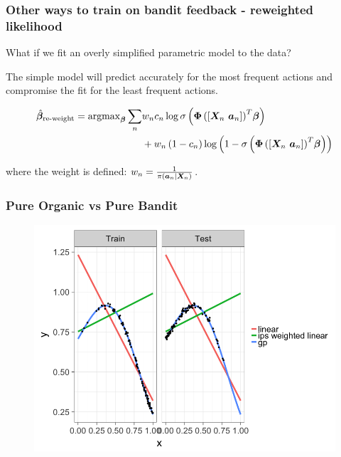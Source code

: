 \begin{frame}
  \frametitle{Other ways to train on bandit feedback - reweighted likelihood}

  What if we fit an overly simplified parametric model to the data?
  \pause

  The simple model will predict accurately for the most frequent actions and compromise the fit for the least frequent actions.


\begin{align*}
	\hat{\bm{\beta}}_{\operatorname{re-weight}} =  {\rm argmax}_{\bm{\beta}}
	\sum_n
	& w_n c_n \log \sigma
		\left(
			{\bm{\Phi}
				\left(
					\left[ {\bm{X}}_n ~ {\bm{a}}_n \right]
				\right)
			}^T \bm{\beta}
		\right)  \\
	& + w_n \left( 1-c_n \right)
		\log
			\left(
				1 - \sigma
					\left(
						{\bm{\Phi} \left(
								\left[ {\bm{X}}_n ~ {\bm{a}}_n \right]
							\right)
						}^T \bm{\beta}
					\right)
			\right)
\end{align*}

where the weight is defined: $w_n = \frac{1}{\pi\left( {\bm{a}}_n | {\bm{X}}_n \right)}$.

\end{frame}


\begin{frame}
  \frametitle{Pure Organic vs Pure Bandit}
\begin{figure}[h!]
\includegraphics[scale=0.34]{images/two_linear_models_and_gp5.png}
\centering
\end{figure}
\end{frame}


